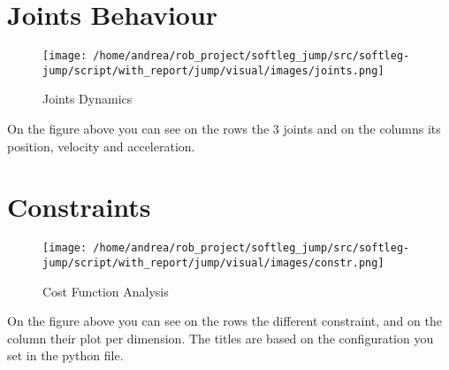 \documentclass{article}%
\begin{document}
%
\section{Joints Behaviour}%
\label{sec:JointsBehaviour}%


\begin{figure}[h!]%
\centering%
\texttt{[image: /home/andrea/rob\_project/softleg\_jump/src/softleg-jump/script/with\_report/jump/visual/images/joints.png]}%
\caption{Joints Dynamics}%
\end{figure}

%
On the figure above you can see on the rows the 3 joints and on the columns its position, velocity and acceleration.

%
\pagebreak%
\section{Constraints}%
\label{sec:Constraints}%


\begin{figure}[h!]%
\centering%
\texttt{[image: /home/andrea/rob\_project/softleg\_jump/src/softleg-jump/script/with\_report/jump/visual/images/constr.png]}%
\caption{Cost Function Analysis}%
\end{figure}

%
On the figure above you can see on the rows the different constraint, and on the column their plot per dimension. The titles are based on the configuration you set in the python file.

%
\end{document}
